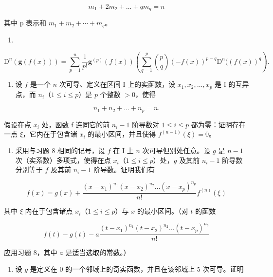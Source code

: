 \[
m _ {1} + 2 m _ {2} + \dots + q m _ {q} = n
\]

其中 p 表示和 \(m_{1} + m_{2} + \cdots + m_{q}\)。

\begin{enumerate}
\def\labelenumi{\alph{enumi})}
\setcounter{enumi}{1}
\tightlist
\item
\end{enumerate}

\[
\mathrm{D} ^ {n} (\mathbf {g} (f (x))) = \sum_ {p = 1} ^ {n} \frac {1}{p !}   \mathbf {g} ^ {(p)} (f (x)) \left(\sum_ {q = 1} ^ {p} \binom {p} {q} (- f (x)) ^ {p - q}   \mathrm{D} ^ {n} ((f (x)) ^ {q}\right).
\]

\begin{enumerate}
\def\labelenumi{\arabic{enumi})}
\setcounter{enumi}{7}
\tightlist
\item
  设 \(f\) 是一个 \(n\) 次可导、定义在区间 \(\mathrm{I}\) 上的实函数，设 \(x_{1}, x_{2}, \ldots, x_{p}\) 是 \(\mathrm{I}\) 的互异点，而 \(n_{i}\)（\(1 \leqslant i \leqslant p\)）是 \(p\) 个整数 \(> 0\)，使得
\end{enumerate}

\[
n _ {1} + n _ {2} + \dots + n _ {p} = n.
\]

假设在点 \(x_{i}\) 处，函数 f 连同它的前 \(n_{i}-1\) 阶导数对 \(1 \leqslant i \leqslant p\) 都为零：证明存在一点 \(\xi\)，它内在于包含诸 \(x_{i}\) 的最小区间，并且使得 \(f^{(n-1)}(\xi) = 0\)。

\begin{enumerate}
\def\labelenumi{\arabic{enumi})}
\setcounter{enumi}{8}
\tightlist
\item
  采用与习题 8 相同的记号，设 \(f\) 在 I 上 \(n\) 次可导但别处任意。设 \(g\) 是 \(n - 1\) 次（实系数）多项式，使得在点 \(x_{i}\)（\(1 \leqslant i \leqslant p\)）处，\(g\) 及其前 \(n_{i} - 1\) 阶导数分别等于 \(f\) 及其前 \(n_{i} - 1\) 阶导数。证明我们有
\end{enumerate}

\[
f (x) = g (x) + \frac {(x - x _ {1}) ^ {n _ {1}} (x - x _ {2}) ^ {n _ {2}} \dots (x - x _ {p}) ^ {n _ {p}}}{n !} f ^ {(n)} (\xi)
\]

其中 \(\xi\) 内在于包含诸点 \(x_{i}\)（\(1 \leqslant i \leqslant p\)）与 \(x\) 的最小区间。（对 \(t\) 的函数

\[
f (t) - g (t) - a \frac {(t - x _ {1}) ^ {n _ {1}} (t - x _ {2}) ^ {n _ {2}} \dots (t - x _ {p}) ^ {n _ {p}}}{n !}
\]

应用习题 8，其中 \(a\) 是适当选取的常数。）

\begin{enumerate}
\def\labelenumi{\arabic{enumi})}
\setcounter{enumi}{9}
\tightlist
\item
  设 \(g\) 是定义在 0 的一个邻域上的奇实函数，并且在该邻域上 5 次可导。证明
\end{enumerate}

